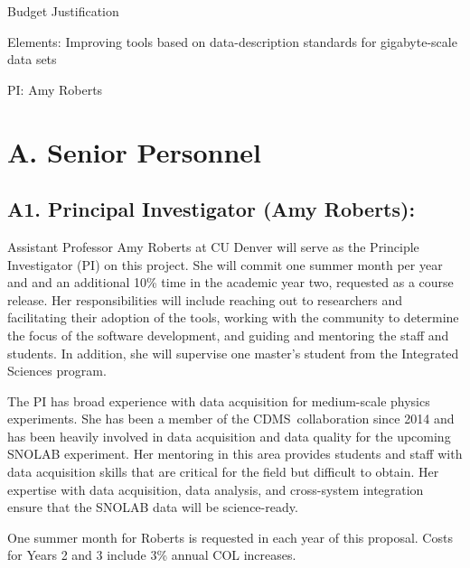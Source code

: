 \documentclass[11pt,oneside]{memoir}
\newcommand{\CDMS}{{\small CDMS}}
\begin{document}
\mainmatter
\pagestyle{bodystyle}

\centerline{Budget Justification}
\centerline{Elements: Improving tools based on data-description standards for gigabyte-scale data sets}
\centerline{PI: Amy Roberts}


\section*{A. Senior Personnel}

\subsection*{A1. Principal Investigator (Amy Roberts):}

Assistant Professor Amy Roberts at CU Denver will serve as the Principle Investigator (PI) on this project.  She will commit one summer month per year and and an additional 10\% time in the academic year two, requested as a course release. Her responsibilities will include reaching out to researchers and facilitating their adoption of the tools, working with the community to determine the focus of the software development, and guiding and mentoring the staff and students.  In addition, she will supervise one master's student from the Integrated Sciences program.

The PI has broad experience with data acquisition for medium-scale physics experiments.  She has been a member of the \CDMS\ collaboration since 2014 and has been heavily involved in data acquisition and data quality for the upcoming SNOLAB experiment.  
Her mentoring in this area provides students and staff with data acquisition skills that are critical for the field but difficult to obtain.  Her expertise with data acquisition, data analysis, and cross-system integration ensure that the SNOLAB data will be science-ready.

One summer month for Roberts is requested in each year of this proposal. Costs for Years 2 and 3 include 3\% annual COL increases. 
\end{document}
